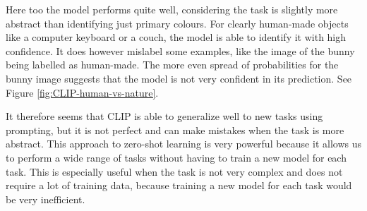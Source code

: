 \documentclass[a4paper]{article}
\begin{document}
Here too the model performs quite well, considering the task is slightly more abstract than identifying just primary
colours. For clearly human-made objects like a computer keyboard or a couch, the model is able to identify it with
high confidence. It does however mislabel some examples, like the image of the bunny being labelled as human-made. The
more even spread of probabilities for the bunny image suggests that the model is not very confident in its prediction.
See Figure \ref{fig:CLIP-human-vs-nature}.

\bigskip
It therefore seems that CLIP is able to generalize well to new tasks using prompting, but it is not perfect and can
make mistakes when the task is more abstract.
This approach to zero-shot learning is very powerful because it allows us to perform a wide range of tasks without
having to train a new model for each task. This is especially useful when the task is not very complex and does not
require a lot of training data, because training a new model for each task would be very inefficient.
\bigskip
\end{document}
